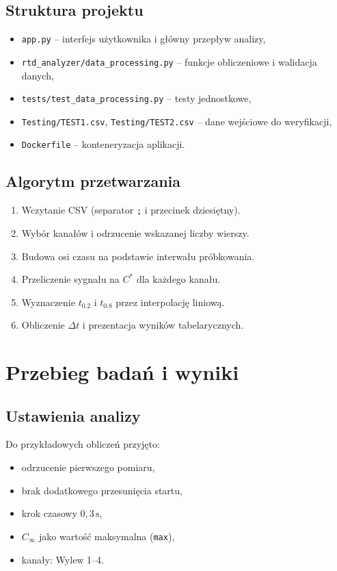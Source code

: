 \documentclass[12pt,a4paper]{article}
\begin{document}
\subsection{Struktura projektu}
\begin{itemize}
    \item \texttt{app.py} -- interfejs użytkownika i główny przepływ analizy,
    \item \texttt{rtd\_analyzer/data\_processing.py} -- funkcje obliczeniowe i walidacja danych,
    \item \texttt{tests/test\_data\_processing.py} -- testy jednostkowe,
    \item \texttt{Testing/TEST1.csv}, \texttt{Testing/TEST2.csv} -- dane wejściowe do weryfikacji,
    \item \texttt{Dockerfile} -- konteneryzacja aplikacji.
\end{itemize}

\subsection{Algorytm przetwarzania}
\begin{enumerate}
    \item Wczytanie CSV (separator \texttt{;} i przecinek dziesiętny).
    \item Wybór kanałów i odrzucenie wskazanej liczby wierszy.
    \item Budowa osi czasu na podstawie interwału próbkowania.
    \item Przeliczenie sygnału na \(C^*\) dla każdego kanału.
    \item Wyznaczenie \(t_{0.2}\) i \(t_{0.8}\) przez interpolację liniową.
    \item Obliczenie \(\Delta t\) i prezentacja wyników tabelarycznych.
\end{enumerate}

\section{Przebieg badań i wyniki}
\subsection{Ustawienia analizy}
Do przykładowych obliczeń przyjęto:
\begin{itemize}
    \item odrzucenie pierwszego pomiaru,
    \item brak dodatkowego przesunięcia startu,
    \item krok czasowy \(0{,}3\,\mathrm{s}\),
    \item \(C_\infty\) jako wartość maksymalna (\texttt{max}),
    \item kanały: Wylew 1--4.
\end{itemize}
\end{document}
